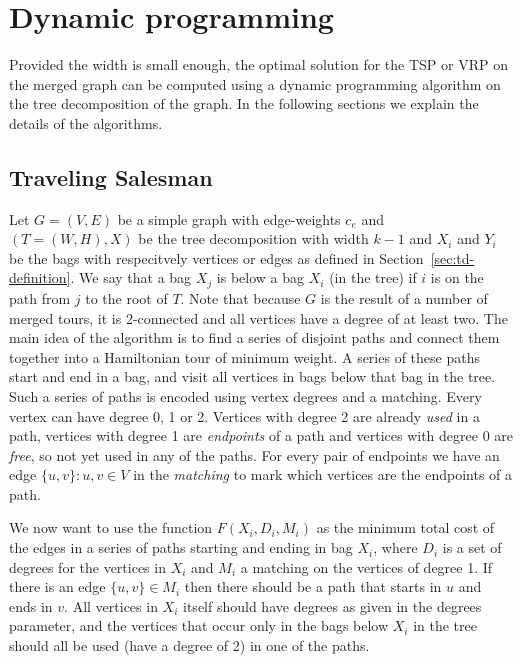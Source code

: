 \documentclass[12pt]{article}
\begin{document}
%
%
\section{Dynamic programming}
\label{sec:dp}
Provided the width is small enough, the optimal solution for the TSP or VRP on the merged graph can
be computed using a dynamic programming algorithm on the tree decomposition of the graph. In the
following sections we explain the details of the algorithms.

    \subsection{Traveling Salesman}
    \label{sec:dp-tsp}
    Let $G=(V, E)$ be a simple graph with edge-weights $c_e$ and $(T=(W, H), X)$ be the tree
    decomposition with width $k - 1$ and $X_i$ and $Y_i$ be the bags with respecitvely vertices or
    edges as defined in Section~\ref{sec:td-definition}. We say that a bag $X_j$ is below a bag
    $X_i$ (in the tree) if $i$ is on the path from $j$ to the root of $T$.
    Note that because $G$ is the result of a number of merged tours, it is 2-connected and all
    vertices have a degree of at least two.
    The main idea of the algorithm is to find a series of disjoint paths and connect them together
    into a Hamiltonian tour of minimum weight. A series of these paths start and end in a bag, and
    visit all vertices in bags below that bag in the tree. Such a series of paths is encoded using
    vertex degrees and a matching.  Every vertex can have degree 0, 1 or 2. Vertices with degree 2
    are already \emph{used} in a path, vertices with degree 1 are \emph{endpoints} of a path and
    vertices with degree 0 are \emph{free}, so not yet used in any of the paths. For every pair of
    endpoints we have an edge $\{u, v\}: u,v \in V$ in the \emph{matching} to mark which vertices
    are the endpoints of a path.

    We now want to use the function $F(X_i, D_i, M_i)$ as the minimum total cost of the edges in a
    series of paths starting and ending in bag $X_i$, where $D_i$ is a set of degrees for the
    vertices in $X_i$ and $M_i$ a matching on the vertices of degree 1. If there is an edge
    $\{u, v\} \in M_i$ then there should be a path that starts in $u$ and ends in $v$. All vertices
    in $X_i$ itself should have degrees as given in the degrees parameter, and the vertices that
    occur only in the bags below $X_i$ in the tree should all be used (have a degree of 2) in one of
    the paths.
\end{document}
